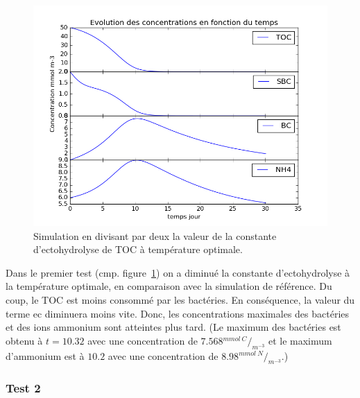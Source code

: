 \begin{figure}[h!]
  \includegraphics[width=\textwidth]{partie1/Test1.png}
  \caption{Simulation en divisant par deux la valeur de la constante d'ectohydrolyse de TOC \`a temp\'erature optimale.
  }
  \label{fig:partie1test1}
\end{figure}
\par{
Dans le premier test (cmp. figure~\ref{fig:partie1test1}) on a diminué la constante d'ectohydrolyse à la température optimale, en comparaison avec
la simulation de référence. Du coup, le TOC est moins consomm\'e par les bact\'eries. En cons\'equence, la valeur du terme
ec diminuera moins vite. Donc, les concentrations maximales des bactéries et des ions ammonium sont atteintes
plus tard. (Le maximum des bactéries est obtenu à $t=10.32$ avec une concentration de
$7.568 {^{mmol~C}/_{m^{-3}}}$ et le maximum d'ammonium est à $10.2$ avec une concentration de
$8.98 {^{mmol~N}/_{m^{-3}}}$.)
}

\FloatBarrier
\newpage
\subsubsection{Test 2}


